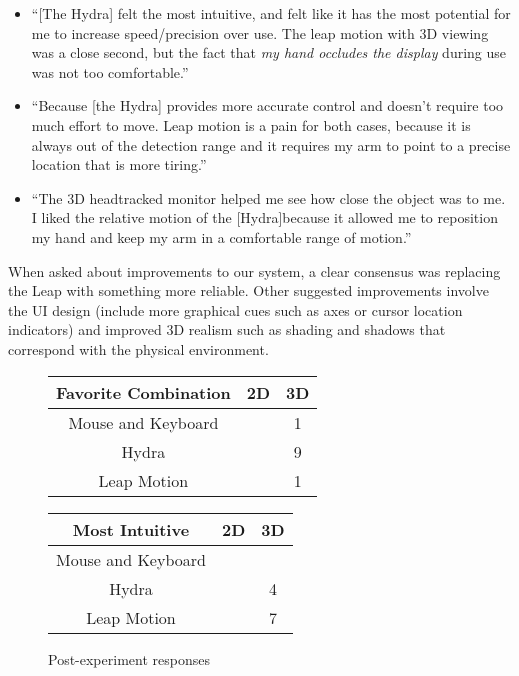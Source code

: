 \begin{itemize}
\item ``[The Hydra] felt the most intuitive, and felt like it has the most
  potential for me to increase speed/precision over use.  The leap motion with
  3D viewing was a close second, but the fact that \emph{my hand occludes the
  display} during use was not too comfortable.''
\item ``Because [the Hydra] provides more accurate control and doesn't require
  too much effort to move. Leap motion is a pain for both cases, because it is
  always out of the detection range and it requires my arm to point to a
  precise location that is more tiring.''
\item ``The 3D headtracked monitor helped me see how close the object was to
  me. I liked the relative motion of the [Hydra]because it allowed me to
  reposition my hand and keep my arm in a comfortable range of motion.''
\end{itemize}

When asked about improvements to our system, a clear consensus was replacing the Leap with something more reliable.  Other suggested improvements involve the
UI design (include more graphical cues such as axes or cursor location
indicators) and improved 3D realism such as shading and shadows that
correspond with the physical environment.

\begin{figure}
    \centering
    \begin{tabular}{c | c | c}
    Favorite Combination & 2D & 3D \\ \hline
    Mouse and Keyboard   &    & 1 \\
    Hydra                &    & 9 \\
    Leap Motion          &    & 1 \\
    \end{tabular}

    \vspace{0.2in}

    \begin{tabular}{c | c | c}
    Most Intuitive     & 2D & 3D \\ \hline
    Mouse and Keyboard &    &  \\
    Hydra              &    & 4 \\
    Leap Motion        &    & 7 \\
    \end{tabular}

    \caption{Post-experiment responses}
    \label{fig:post}
\end{figure}


